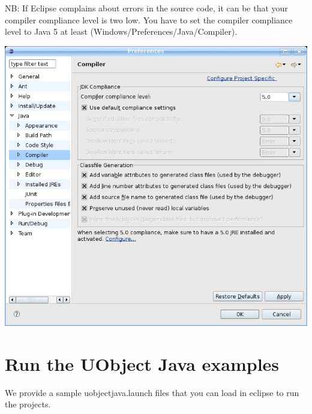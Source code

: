 NB: If Eclipse complains about errors in the source code, it can be that
your compiler compliance level is two low. You have to set the compiler
compliance level to Java 5 at least (Windows/Preferences/Java/Compiler).

\begin{center}
  \includegraphics[width=0.6\linewidth]{img/compiler-compliance-level}
\end{center}


\section{Run the UObject Java examples}


We provide a sample uobjectjava.launch files that you can load in eclipse to
run the projects.

